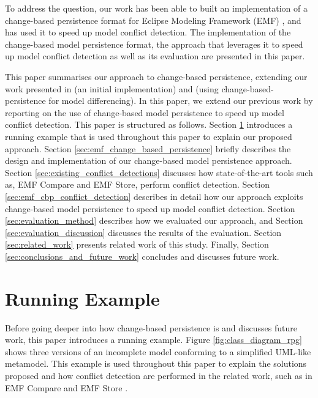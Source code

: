 To address the question, our work has been able to built an implementation of a change-based persistence format for Eclipse Modeling Framework (EMF) \cite{eclipse2019emf}, and has used it to speed up model conflict detection. The implementation of the change-based model persistence format, the approach that leverages it to speed up model conflict detection as well as its evaluation are presented in this paper. 

This paper summarises our approach to change-based persistence, extending our work presented in \cite{DBLP:conf/models/YohannisKP17} (an initial implementation) and \cite{yohannis2019efficient} (using change-based-persistence for model differencing). In this paper, we extend our
previous work by reporting on the use of change-based model persistence to speed up model conflict detection. This paper is structured as follows. Section \ref{sec:running_example} introduces a running example that is used throughout this paper to explain our proposed approach. Section \ref{sec:emf_change_based_persistence} briefly describes the design and implementation of our change-based model persistence approach.  
Section \ref{sec:existing_conflict_detections} discusses how state-of-the-art tools such as, EMF Compare and EMF Store, perform conflict detection. Section \ref{sec:emf_cbp_conflict_detection} describes in detail how our approach exploits change-based model persistence to speed up model conflict detection. Section \ref{sec:evaluation_method} describes how we evaluated our approach, and Section \ref{sec:evaluation_discussion} discusses the results of the evaluation. Section \ref{sec:related_work} presents related work of this study. Finally, Section \ref{sec:conclusions_and_future_work} concludes and discusses future work.

\section{Running Example}
\label{sec:running_example}

Before going deeper into how change-based persistence is and discusses future work, this paper introduces a running example. Figure \ref{fig:class_diagram_rpg} shows three versions of an incomplete model conforming to a simplified UML-like metamodel. This example is used throughout this paper to explain the solutions proposed and how conflict detection are performed in the related work, such as in EMF Compare \cite{emfcompare2018developer} and EMF Store \cite{emfstore2019what}. 

